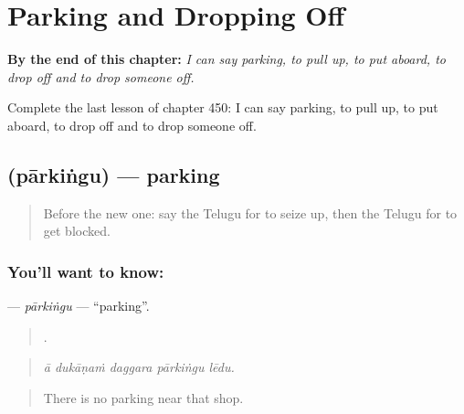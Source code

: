 
\chapter{Parking and Dropping Off}
\label{ch:te-parking-and-dropping-off}

\begin{chapteropening}
\textbf{By the end of this chapter:} \emph{I can say parking, to pull up, to put aboard, to drop off and to drop someone off.}

Complete the last lesson of chapter 450: I can say parking, to pull up, to put aboard, to drop off and to drop someone off.
\end{chapteropening}

\section[\texorpdfstring{\te{పార్కింగు} (pārkiṅgu)}{పార్కింగు (pārkiṅgu)}]{ (pārkiṅgu) — parking}

\label{lesson:TE-C450-parkingu}



\begin{quote}
Before the new one: say the Telugu for to seize up, then the Telugu for to get blocked.
\end{quote}

\subsection*{You'll want to know: }
\textbf{} — \emph{pārkiṅgu} — \textquotedblleft{}parking\textquotedblright{}.

\begin{quote}
    .
\end{quote}

\begin{quote}
\emph{ā dukāṇaṁ daggara pārkiṅgu lēdu.}
\end{quote}

\begin{quote}
There is no parking near that shop.
\end{quote}

